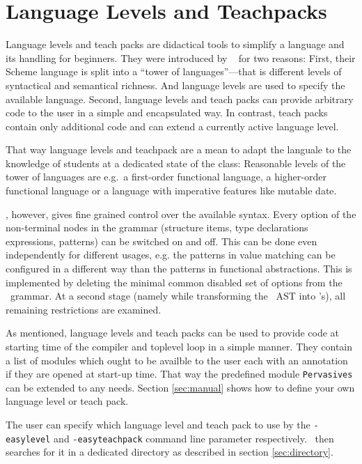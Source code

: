 
\section{Language Levels and Teachpacks}
\label{sec:teachpacks}

Language levels and teach packs are didactical tools to simplify a language and
its handling for beginners. They were introduced by \drscheme\
\citep{Felleisen98thedrscheme}  for two reasons: First, their Scheme language is
split into a ``tower of languages''---that is different levels of syntactical
and semantical richness. And language levels are used to specify the available
language. Second, language levels and teach packs can provide arbitrary code to
the user in a simple and encapsulated way. In contrast, teach packs contain only
additional code and can extend a currently active language level.

That way language levels and teachpack are a mean to adapt the languale to the
knowledge of students at a dedicated state of the class: Reasonable levels of
the tower of languages are e.g.\ a first-order functional language, a
higher-order functional language or a language with imperative features like
mutable date.

\easyocaml, however, gives fine grained control over the available syntax. Every
option of the non-terminal nodes in the grammar (structure items, type
declarations  expressions, patterns) can be switched on and off. This can be
done even independently for different usages, e.g. the patterns in value
matching\ttfootnote{match \dots\ with \emph{pat} -> \dots} can be configured
in a different way than the patterns in functional
abstractions. This is implemented by
deleting the minimal common disabled set of options from the \camlpf\ grammar.
At a second stage (namely while transforming the \ocaml\ AST into \easyocaml's),
all remaining restrictions are examined.

As mentioned, language levels and teach packs can be used to provide code at
starting time of the compiler and toplevel loop in a simple manner. They contain
a list of modules which ought to be availble to the user each with an annotation
if they are opened at start-up time. That way the predefined module
\texttt{Pervasives} can be extended to any needs.
Section \ref{sec:manual} shows how to define your own language level or teach
pack.

The user can specify which language level and teach pack to use by the 
\texttt{-easylevel} and \texttt{-easyteachpack} command line parameter 
respectively. \easyocaml\ then searches for it in a dedicated directory as
described in section \ref{sec:directory}.

